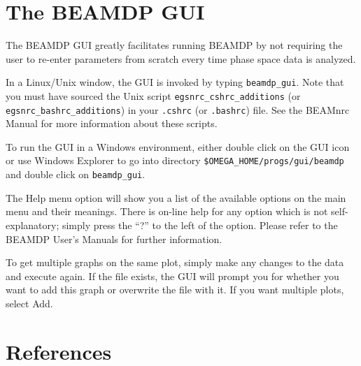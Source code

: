 \documentclass[12pt,twoside]{article}
\begin{document}

\section{The BEAMDP GUI}

The BEAMDP GUI greatly facilitates running BEAMDP by not requiring
the user to re-enter parameters from scratch every time phase space
data is analyzed.

In a Linux/Unix window, the GUI is invoked by typing {\tt beamdp\_gui}.
Note that you must have sourced the Unix script
{\tt egsnrc\_cshrc\_additions} (or {\tt egsnrc\_bashrc\_additions}) in
your {\tt .cshrc} (or {\tt .bashrc}) file.  See the BEAMnrc Manual\cite{Ro04a}
for more information about these scripts.

To run the GUI in a Windows environment, either double click on
the GUI icon or use Windows Explorer to go into directory
{\tt \$OMEGA\_HOME/progs/gui/beamdp} and double click on
{\tt beamdp\_gui}.

The {\sf Help} menu option will show you a list of the available
options on the main menu and their meanings.
There is on-line help for any option which is not self-explanatory;
simply press the ``?'' to the left of the option.
Please refer to the BEAMDP User's Manuals\cite{MR04a,MR04b}
for further information.

To get multiple graphs on the same plot, simply make any changes to the
data and execute again.  If the file exists, the GUI will prompt you for
whether you want to add this graph or overwrite the file with it.  If
you want multiple plots, select {\sf Add}.

\section{References}



\end{document}
